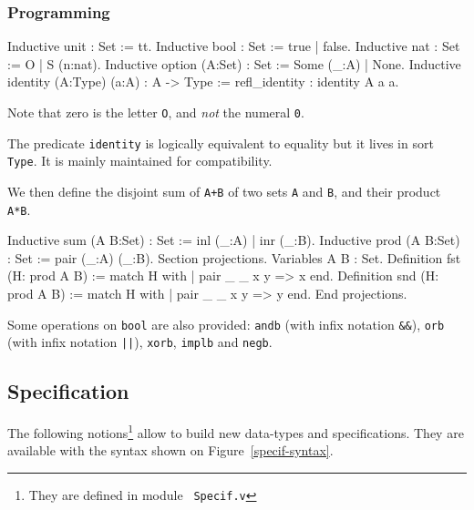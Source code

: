 \subsubsection[Programming]{Programming\label{Programming}
\label{libnats}
}

\begin{coq_example*}
Inductive unit : Set := tt.
Inductive bool : Set := true | false.
Inductive nat : Set := O | S (n:nat).
Inductive option (A:Set) : Set := Some (_:A) | None.
Inductive identity (A:Type) (a:A) : A -> Type :=
    refl_identity : identity A a a.
\end{coq_example*}

Note that zero is the letter \verb:O:, and {\sl not} the numeral
\verb:0:.

The predicate {\tt identity} is logically
equivalent to equality but it lives in sort {\tt
  Type}. It is mainly maintained for compatibility.

We then define the disjoint sum of \verb:A+B: of two sets \verb:A: and
\verb:B:, and their product \verb:A*B:.
\ttindex{+}
\ttindex{*}

\begin{coq_example*}
Inductive sum (A B:Set) : Set := inl (_:A) | inr (_:B).
Inductive prod (A B:Set) : Set := pair (_:A) (_:B).
Section projections.
Variables A B : Set.
Definition fst (H: prod A B) := match H with
                                | pair _ _ x y => x
                                end.
Definition snd (H: prod A B) := match H with
                                | pair _ _ x y => y
                                end.
End projections.
\end{coq_example*}

Some operations on {\tt bool} are also provided: {\tt andb} (with
infix notation {\tt \&\&}), {\tt orb} (with
infix notation {\tt ||}), {\tt xorb}, {\tt implb} and {\tt negb}.

\subsection{Specification}

The following notions\footnote{They are defined in module {\tt
Specif.v}} allow to build new data-types and specifications.
They are available with the syntax shown on
Figure~\ref{specif-syntax}.

